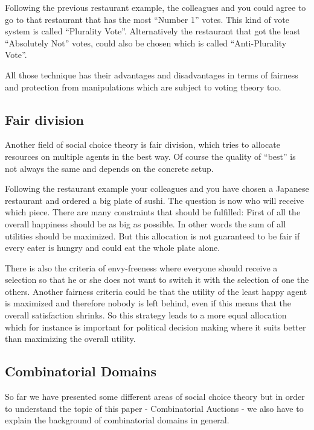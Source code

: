 \documentclass[a4paper]{paper}
\begin{document}
Following the previous restaurant example, the colleagues and you could agree to go to that restaurant that has the most ``Number 1'' votes. This kind of vote system is called ``Plurality Vote''. Alternatively the restaurant that got the least ``Absolutely Not'' votes, could also be chosen which is called ``Anti-Plurality Vote''.

All those technique has their advantages and disadvantages in terms of fairness and protection from manipulations which are subject to voting theory too.~\cite[Chapter~3]{BCE12}

\subsection{Fair division}

Another field of social choice theory is fair division, which tries to allocate resources on multiple agents in the best way. Of course the quality of ``best'' is not always the same and depends on the concrete setup.

Following the restaurant example your colleagues and you have chosen a Japanese restaurant and ordered a big plate of sushi. The question is now who will receive which piece. There are many constraints that should be fulfilled: First of all the overall happiness should be as big as possible. In other words the sum of all utilities should be maximized. But this allocation is not guaranteed to be fair if every eater is hungry and could eat the whole plate alone.

There is also the criteria of envy-freeness where everyone should receive a selection so that he or she does not want to switch it with the selection of one the others. Another fairness criteria could be that the utility of the least happy agent is maximized and therefore nobody is left behind, even if this means that the overall satisfaction shrinks. So this strategy leads to a more equal allocation which for instance is important for political decision making where it suits better than maximizing the overall utility.~\cite[Chapter~5]{BCE12}

\subsection{Combinatorial Domains}

So far we have presented some different areas of social choice theory but in order to understand the topic of this paper - Combinatorial Auctions - we also have to explain the background of combinatorial domains in general.
\end{document}
